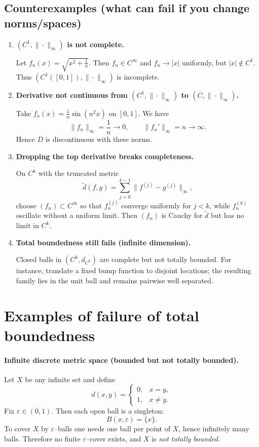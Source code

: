\documentclass[12pt,a4paper]{article}
\begin{document}
\subsection*{Counterexamples (what can fail if you change norms/spaces)}

\begin{enumerate}
	
	\item \textbf{$(C^1,\|\cdot\|_\infty)$ is not complete.}
	
	Let $f_n(x)=\sqrt{x^2+\tfrac{1}{n}}$.  
	Then $f_n\in C^\infty$ and $f_n\to |x|$ uniformly, but $|x|\notin C^1$.  
	Thus $(C^1([0,1]),\|\cdot\|_\infty)$ is incomplete.
	
	\medskip
	
	\item \textbf{Derivative not continuous from $(C^1,\|\cdot\|_\infty)$ to $(C,\|\cdot\|_\infty)$.}
	
	Take $f_n(x)=\tfrac{1}{n}\sin(n^2 x)$ on $[0,1]$.  
	We have
	\[
	\|f_n\|_\infty=\frac{1}{n}\longrightarrow 0,
	\qquad
	\|f_n'\|_\infty = n \longrightarrow \infty .
	\]
	Hence $D$ is discontinuous with these norms.
	
	\medskip
	
	\item \textbf{Dropping the top derivative breaks completeness.}
	
	On $C^k$ with the truncated metric
	\[
	\tilde d(f,g)=\sum_{j=0}^{k-1}\|f^{(j)}-g^{(j)}\|_\infty,
	\]
	choose $(f_n)\subset C^\infty$ so that $f_n^{(j)}$ converge uniformly for $j<k$,  
	while $f_n^{(k)}$ oscillate without a uniform limit.  
	Then $(f_n)$ is Cauchy for $\tilde d$ but has no limit in $C^k$.
	
	\medskip
	
	\item \textbf{Total boundedness still fails (infinite dimension).}
	
	Closed balls in $(C^k,d_{C^k})$ are complete but not totally bounded.  
	For instance, translate a fixed bump function to disjoint locations;  
	the resulting family lies in the unit ball and remains pairwise well separated.
	
\end{enumerate}

\section*{Examples of failure of total boundedness}

\paragraph{Infinite discrete metric space (bounded but not totally bounded).}
Let $X$ be any infinite set and define
\[
d(x,y)=
\begin{cases}
	0,& x=y,\\
	1,& x\neq y.
\end{cases}
\]
Fix $\varepsilon\in(0,1)$. Then each open ball is a singleton:
\[
B(x,\varepsilon)=\{x\}.
\]
To cover $X$ by $\varepsilon$–balls one needs one ball per point of $X$, hence
infinitely many balls. Therefore no finite $\varepsilon$–cover exists, and $X$ is
\emph{not totally bounded}.
\end{document}

